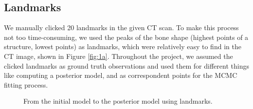 \documentclass{IEEEtran}
\begin{document}
\subsection{Landmarks}
We manually clicked 20 landmarks in the given CT scan. To make this process not too time-consuming, we used the peaks of the bone shape (highest points of a structure, lowest points) as landmarks, which were relatively easy to find in the CT image, shown in Figure \ref{fig:1a}. Throughout the project, we assumed the clicked landmarks as ground truth observations and used them for different things like computing a posterior model, and as correspondent points for the MCMC fitting process.

\begin{figure}[h]
	\hfill
	\caption{From the initial model to the posterior model using landmarks.}
\end{figure}
\end{document}
